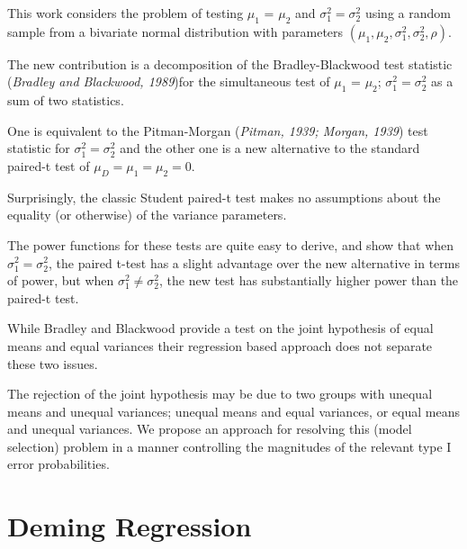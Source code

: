 \documentclass[12pt, a4paper]{report}
\theoremstyle{plain}
\theoremstyle{definition}
\theoremstyle{remark}
\begin{document}
	This work considers the problem of testing $\mu_1$ = $\mu_2$ and $\sigma^2_1 = \sigma^2_2$ using a random sample from a bivariate normal distribution with parameters $(\mu_1, \mu_2, \sigma^2_1, \sigma^2_2, \rho)$. 
	
	The new contribution is a decomposition of the Bradley-Blackwood test statistic (\textit{Bradley and Blackwood, 1989})for the simultaneous test of {$\mu_1$ = $\mu_2$; $\sigma^2_1 = \sigma^2_2$}  as a sum of two statistics. 
	
	One is equivalent to the Pitman-Morgan (\textit{Pitman, 1939; Morgan, 1939}) test statistic 
	for $\sigma^2_1 = \sigma^2_2$ and the other one is a new alternative to the standard paired-t test of $\mu_D = \mu_1 = \mu_2 = 0$. 
	
	Surprisingly, the classic Student paired-t test makes no assumptions about the equality (or otherwise) of the 
	variance parameters. 
	
	The power functions for these tests are quite easy to derive, and show that when $\sigma^2_1 = \sigma^2_2$, 
	the paired t-test has a slight advantage over the new alternative in terms of power, but when $\sigma^2_1 \neq \sigma^2_2$, the 
	new test has substantially higher power than the paired-t test.
	
	While Bradley and Blackwood provide a test on the joint hypothesis of equal means and equal variances their regression based approach does not separate these two issues.
	
	The rejection of the joint hypothesis may be 
	due to two groups with unequal means and unequal variances; unequal means and equal variances, or equal means and unequal variances. We propose an approach for resolving this (model selection) problem in a manner controlling the magnitudes of the relevant type I error probabilities.
	
	
	
	
	\section*{Deming Regression}
	
\end{document}
